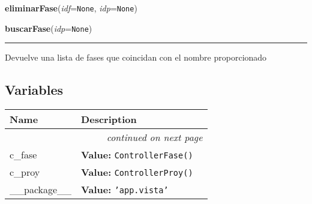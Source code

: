     \vspace{0.5ex}

\hspace{.8\funcindent}\begin{boxedminipage}{\funcwidth}

    \raggedright \textbf{eliminarFase}(\textit{idf}={\tt None}, \textit{idp}={\tt None})

\setlength{\parskip}{2ex}
\setlength{\parskip}{1ex}
    \end{boxedminipage}

    \label{app:vista:vistaFase:buscarFase}

    \vspace{0.5ex}

\hspace{.8\funcindent}\begin{boxedminipage}{\funcwidth}

    \raggedright \textbf{buscarFase}(\textit{idp}={\tt None})

    \vspace{-1.5ex}

    \rule{\textwidth}{0.5\fboxrule}
\setlength{\parskip}{2ex}
    Devuelve una lista de fases que coincidan con el nombre proporcionado

\setlength{\parskip}{1ex}
    \end{boxedminipage}



  \subsection{Variables}

    \vspace{-1cm}
\hspace{\varindent}\begin{longtable}{|p{\varnamewidth}|p{\vardescrwidth}|l}
\cline{1-2}
\cline{1-2} \centering \textbf{Name} & \centering \textbf{Description}& \\
\cline{1-2}
\endhead\cline{1-2}\multicolumn{3}{r}{\small\textit{continued on next page}}\\\endfoot\cline{1-2}
\endlastfoot\raggedright c\-\_\-f\-a\-s\-e\- & \raggedright \textbf{Value:} 
{\tt ControllerFase()}&\\
\cline{1-2}
\raggedright c\-\_\-p\-r\-o\-y\- & \raggedright \textbf{Value:} 
{\tt ControllerProy()}&\\
\cline{1-2}
\raggedright \_\-\_\-p\-a\-c\-k\-a\-g\-e\-\_\-\_\- & \raggedright \textbf{Value:} 
{\tt \texttt{'}\texttt{app.vista}\texttt{'}}&\\
\cline{1-2}
\end{longtable}

